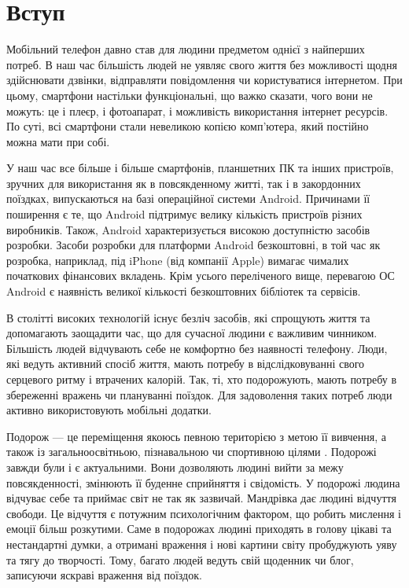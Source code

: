 \documentclass[../main.tex]{subfiles}
\begin{document}
\chapter*{Вступ}

Мобільний телефон давно став для людини предметом однієї з найперших потреб. В наш час більшість людей не уявляє свого життя без можливості щодня здійснювати дзвінки, відправляти повідомлення чи користуватися інтернетом. При цьому, смартфони настільки функціональні, що важко
сказати, чого вони не можуть: це і плеєр, і фотоапарат, і можливість використання інтернет ресурсів. По суті, всі смартфони стали невеликою копією комп'ютера, який постійно можна мати при собі.

У наш час все більше і більше смартфонів, планшетних ПК та інших пристроїв, зручних для використання як в повсякденному житті, так і в закордонних поїздках, випускаються на базі операційної системи Android. Причинами її поширення є те, що Android підтримує велику кількість пристроїв різних виробників. Також, Android характеризується високою доступністю засобів розробки. Засоби розробки для платформи Android безкоштовні, в той час як розробка, наприклад, під iPhone (від компанії Apple) вимагає чималих початкових фінансових вкладень. Крім усього переліченого вище, перевагою ОС Android є наявність великої кількості безкоштовних бібліотек та сервісів.

В столітті високих технологій існує безліч засобів, які спрощують життя та допомагають заощадити час, що для сучасної людини є важливим чинником. Більшість людей відчувають себе не комфортно без наявності телефону. Люди, які ведуть активний спосіб життя, мають потребу в відслідковуванні свого серцевого ритму і втрачених калорій. Так, ті, хто подорожують, мають потребу в збереженні вражень чи плануванні поїздок. Для задоволення таких потреб люди активно використовують мобільні додатки.

Подорож — це переміщення якоюсь певною територією з метою її вивчення, а також із загальноосвітньою, пізнавальною чи спортивною цілями \cite{travel}. Подорожі завжди були і є актуальними. Вони дозволяють людині вийти за межу повсякденності, змінюють її буденне сприйняття і свідомість. У подорожі людина відчуває себе та приймає світ не так як зазвичай. Мандрівка дає людині відчуття свободи. Це відчуття є потужним психологічним фактором, що робить мислення і емоції більш розкутими. Саме в подорожах людині приходять в голову цікаві та нестандартні думки, а отримані враження і нові картини світу пробуджують уяву та тягу до творчості. Тому, багато людей ведуть свій щоденник чи блог, записуючи яскраві враження від поїздок. 
\end{document}
